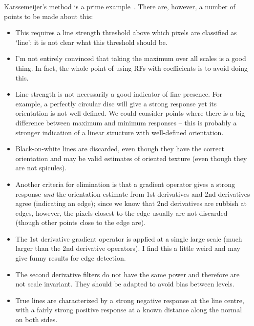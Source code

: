 Karssemeijer's method is a prime example~\cite{Karssemeijer_teBrake_TMI96}. There are, however, a number of points to be made about this:

\begin{itemize}
\item This requires a line strength threshold above which pixels are classified as `line'; it is not clear what this threshold should be. 

\item I'm not entirely convinced that taking the maximum over all scales is a good thing. In fact, the whole point of using RFs with \dtcwt{} coefficients is to avoid doing this.

\item Line strength is not necessarily a good indicator of line presence. For example, a perfectly circular disc will give a strong response yet its orientation is not well defined. We could consider points where there is a big difference between maximum and minimum responses -- this is probably a stronger indication of a linear structure with well-defined orientation.

\item Black-on-white lines are discarded, even though they have the correct orientation and may be valid estimates of oriented texture (even though they are not spicules). 

\item Another criteria for elimination is that a gradient operator gives a strong response \emph{and} the orientation estimate from 1st derivatives and 2nd derivatives agree (indicating an edge); since we know that 2nd derivatives are rubbish at edges, however, the pixels closest to the edge usually are not discarded (though other points close to the edge are).

\item The 1st derivative gradient operator is applied at a single large scale (much larger than the 2nd derivative operators). I find this a little weird and may give funny results for edge detection.

\item The second derivative filters do not have the same power and therefore are not scale invariant. They should be adapted to avoid bias between levels.

\item True lines are characterized by a strong negative response at the line centre, with a fairly strong positive response at a known distance along the normal on both sides. 
\end{itemize}


